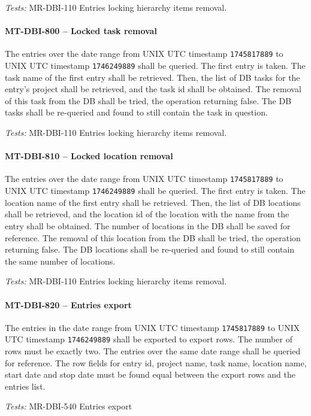 \textit{Tests: } MR-DBI-110 Entries locking hierarchy items removal.

\paragraph{MT-DBI-800 -- Locked task removal}
The entries over the date range from UNIX UTC timestamp
\lstinline{1745817889} to UNIX UTC timestamp \lstinline{1746249889}
shall be queried. The first entry is taken.
The task name of the first entry shall be retrieved.
Then, the list of DB tasks for the entry's project shall be retrieved, and the
task id shall be obtained.
The removal of this task from the DB shall be tried, the operation
returning false. The DB tasks shall be re-queried and found to still
contain the task in question.

\textit{Tests: } MR-DBI-110 Entries locking hierarchy items removal.

\paragraph{MT-DBI-810 -- Locked location removal}
The entries over the date range from UNIX UTC timestamp
\lstinline{1745817889} to UNIX UTC timestamp \lstinline{1746249889}
shall be queried. The first entry is taken.
The location name of the first entry shall be retrieved.
Then, the list of DB locations shall be retrieved, and the location
id of the location with the name from the entry shall be obtained.
The number of locations in the DB shall be saved for reference.
The removal of this location from the DB shall be tried, the operation
returning false. The DB locations shall be re-queried and found to still
contain the same number of locations.

\textit{Tests: } MR-DBI-110 Entries locking hierarchy items removal.

\paragraph{MT-DBI-820 -- Entries export}
The entries in the date range from UNIX UTC timestamp \lstinline{1745817889} to
UNIX UTC timestamp \lstinline{1746249889} shall be exported to export rows. The
number of rows must be exactly two.
The entries over the same date range shall be queried for reference. The row
fields for entry id, project name, task name, location name, start date and stop
date must be found equal between the export rows and the entries list.

\textit{Tests: } MR-DBI-540 Entries export

